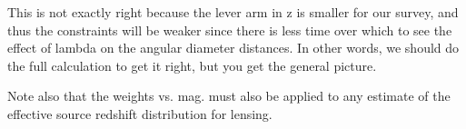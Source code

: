 \documentclass[preprint]{aastex}
\begin{document}
This is not exactly right because the lever arm in z is smaller for our survey,
and thus the constraints will be weaker since there is less time over which to
see the effect of lambda on the angular diameter distances.  In other words, we
should do the full calculation to get it right, but you get the general
picture.

Note also that the weights vs. mag. must also be applied to any estimate of the
effective source redshift distribution for lensing.


\begin{figure}
 
\end{figure}


\begin{figure}
 
\end{figure}



\end{document}
